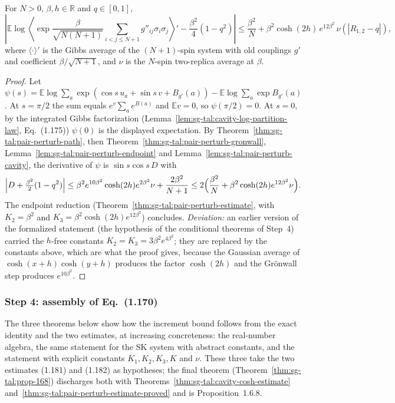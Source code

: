 \begin{theorem}
\label{thm:sg-tal:pair-perturb-estimate-proved}
  \leanok
{}
For $N>0$, $\beta,h\in\mathbb R$ and $q\in[0,1]$,
\[
 \left|\mathbb E\log\left\langle\exp\frac{\beta}{\sqrt{N(N+1)}}\sum_{i<j\le N+1}g''_{ij}\sigma_i\sigma_j\right\rangle'
 -\frac{\beta^2}{4}(1-q^2)\right|\le\frac{\beta^2}{N}+\beta^2\cosh(2h)\,e^{12\beta^2}\,\nu(|R_{1,2}-q|),
\]
where $\langle\cdot\rangle'$ is the Gibbs average of the $(N+1)$-spin system with old couplings $g'$ and
coefficient $\beta/\sqrt{N+1}$, and $\nu$ is the $N$-spin two-replica average at $\beta$.
\end{theorem}
\begin{proof}
  \leanok
Let $\psi(s)=\mathbb E\log\sum_a\exp(\cos s\,u_a+\sin s\,v+B_{g'}(a))-\mathbb E\log\sum_a\exp B_{g'}(a)$.
At $s=\pi/2$ the sum equals $e^{v}\sum_a e^{B(a)}$ and $\mathbb Ev=0$, so $\psi(\pi/2)=0$.  At $s=0$, by
the integrated Gibbs factorization (Lemma~\ref{lem:sg-tal:cavity-log-partition-law}, Eq.~(1.175)) $\psi(0)$ is the
displayed expectation.  By Theorem~\ref{thm:sg-tal:pair-perturb-path}, then
Theorem~\ref{thm:sg-tal:pair-perturb-gronwall}, Lemma~\ref{lem:sg-tal:pair-perturb-endpoint} and
Lemma~\ref{lem:sg-tal:pair-perturb-cavity}, the derivative of $\psi$ is $\sin s\cos s\,D$ with
\[
 \Bigl|D+\tfrac{\beta^2}{2}(1-q^2)\Bigr|\le\beta^2e^{10\beta^2}\cosh(2h)e^{2\beta^2}\nu+\frac{2\beta^2}{N+1}
 \le2\Bigl(\frac{\beta^2}{N}+\beta^2\cosh(2h)e^{12\beta^2}\nu\Bigr).
\]
The endpoint reduction (Theorem~\ref{thm:sg-tal:pair-perturb-estimate}, with $K_2=\beta^2$ and
$K_3=\beta^2\cosh(2h)e^{12\beta^2}$) concludes.
\emph{Deviation:} an earlier version of the formalized statement (the hypothesis of the conditional
theorems of Step~4) carried the $h$-free constants $K_2=K_3=3\beta^2e^{4\beta^2}$; they are replaced by the
constants above, which are what the proof gives, because the Gaussian average of
$\cosh(x+h)\cosh(y+h)$ produces the factor $\cosh(2h)$ and the Gr\"onwall step produces $e^{10\beta^2}$.
\end{proof}

\subsubsection{Step 4: assembly of Eq.~(1.170)}
The three theorems below show how the increment bound follows from the exact identity and the two
estimates, at increasing concreteness: the real-number algebra, the same statement for the SK system with
abstract constants, and the statement with explicit constants $K_1,K_2,K_3,K$ and $\nu$.
These three take the two estimates (1.181) and (1.182) as hypotheses; the final theorem
(Theorem~\ref{thm:sg-tal:prop-168}) discharges both with Theorems~\ref{thm:sg-tal:cavity-cosh-estimate}
and~\ref{thm:sg-tal:pair-perturb-estimate-proved} and is Proposition~1.6.8.

